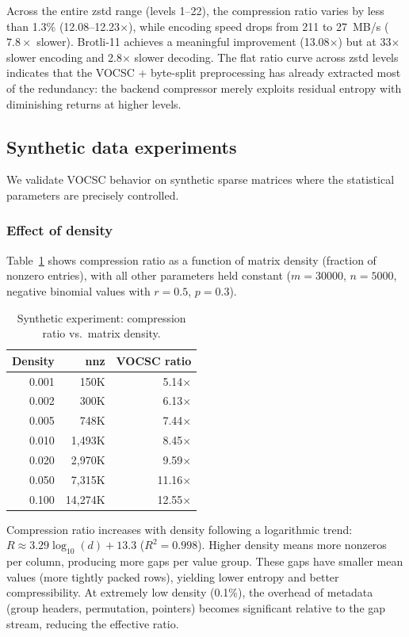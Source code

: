\documentclass[10pt,twocolumn,letterpaper]{article}
\begin{document}
Across the entire zstd range (levels 1--22), the compression ratio varies by less than 1.3\% (12.08--12.23$\times$), while encoding speed drops from 211 to 27~MB/s ($7.8\times$ slower).
Brotli-11 achieves a meaningful improvement (13.08$\times$) but at 33$\times$ slower encoding and 2.8$\times$ slower decoding.
The flat ratio curve across zstd levels indicates that the VOCSC + byte-split preprocessing has already extracted most of the redundancy: the backend compressor merely exploits residual entropy with diminishing returns at higher levels.

\subsection{Synthetic data experiments}
\label{sec:synthetic}

We validate VOCSC behavior on synthetic sparse matrices where the statistical parameters are precisely controlled.

\subsubsection{Effect of density}

Table~\ref{tab:density} shows compression ratio as a function of matrix density (fraction of nonzero entries), with all other parameters held constant ($m = 30000$, $n = 5000$, negative binomial values with $r = 0.5$, $p = 0.3$).

\begin{table}[t]
\centering
\caption{Synthetic experiment: compression ratio vs.\ matrix density.}
\label{tab:density}
\footnotesize
\begin{tabular}{rrr}
\toprule
Density & nnz & VOCSC ratio \\
\midrule
0.001 &    150K & 5.14$\times$ \\
0.002 &    300K & 6.13$\times$ \\
0.005 &    748K & 7.44$\times$ \\
0.010 &  1,493K & 8.45$\times$ \\
0.020 &  2,970K & 9.59$\times$ \\
0.050 &  7,315K & 11.16$\times$ \\
0.100 & 14,274K & 12.55$\times$ \\
\bottomrule
\end{tabular}
\end{table}

Compression ratio increases with density following a logarithmic trend: $R \approx 3.29 \log_{10}(d) + 13.3$ ($R^2 = 0.998$).
Higher density means more nonzeros per column, producing more gaps per value group.
These gaps have smaller mean values (more tightly packed rows), yielding lower entropy and better compressibility.
At extremely low density (0.1\%), the overhead of metadata (group headers, permutation, pointers) becomes significant relative to the gap stream, reducing the effective ratio.
\end{document}
